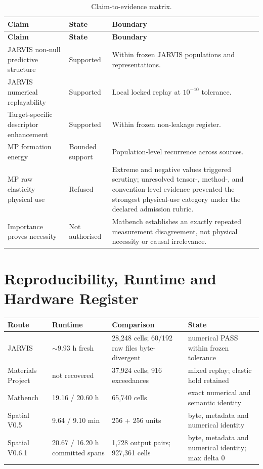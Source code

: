 \documentclass[11pt,a4paper,oneside]{report}
\begin{document}
\begin{longtable}{L{0.39\textwidth}L{0.18\textwidth}L{0.33\textwidth}}
\caption{Claim-to-evidence matrix.} \label{tab:claim-evidence-matrix} \\
\toprule
\textbf{Claim} & \textbf{State} & \textbf{Boundary} \\
\midrule
\endfirsthead
\toprule
\textbf{Claim} & \textbf{State} & \textbf{Boundary} \\
\midrule
\endhead
JARVIS non-null predictive structure & Supported & Within frozen JARVIS populations and representations. \\
JARVIS numerical replayability & Supported & Local locked replay at $10^{-10}$ tolerance. \\
Target-specific descriptor enhancement & Supported & Within frozen non-leakage register. \\
MP formation energy & Bounded support & Population-level recurrence across sources. \\
MP raw elasticity physical use & Refused & Extreme and negative values triggered scrutiny; unresolved tensor-, method-, and convention-level evidence prevented the strongest physical-use category under the declared admission rubric. \\
Importance proves necessity & Not authorised & Matbench establishes an exactly repeated measurement disagreement, not physical necessity or causal irrelevance. \\
\bottomrule
\end{longtable}


\chapter{Reproducibility, Runtime and Hardware Register}

\begin{longtable}{p{}p{}p{}p{}}
\toprule Route & Runtime & Comparison & State \\
\midrule
JARVIS & $\sim$9.93 h fresh & 28,248 cells; 60/192 raw files byte-divergent & numerical PASS within frozen tolerance \\
Materials Project & not recovered & 37,924 cells; 916 exceedances & mixed replay; elastic hold retained \\
Matbench & 19.16 / 20.60 h & 65,740 cells & exact numerical and semantic identity \\
Spatial V0.5 & 9.64 / 9.10 min & 256 + 256 units & byte, metadata and numerical identity \\
Spatial V0.6.1 & 20.67 / 16.20 h committed spans & 1,728 output pairs; 927,361 cells & byte, metadata and numerical identity; max delta 0 \\
\bottomrule
\end{longtable}
\end{document}
